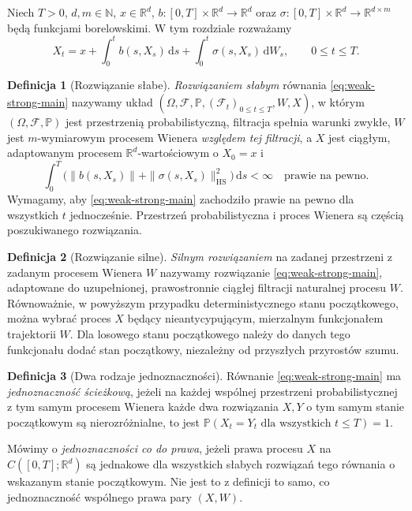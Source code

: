 \documentclass[11pt,a4paper,oneside]{report}
\numberwithin{equation}{chapter}
\theoremstyle{plain}
\theoremstyle{definition}
\newtheorem{definicja}{Definicja}[chapter]
\theoremstyle{remark}
\newcommand{\R}{\mathbb{R}}
\newcommand{\N}{\mathbb{N}}
\newcommand{\Prob}{\mathbb{P}}
\newcommand{\calF}{\mathcal{F}}
\newcommand{\dd}{\mathrm{d}}
\begin{document}
Niech $T>0$, $d,m\in\N$, $x\in\R^d$,
$b:[0,T]\times\R^d\to\R^d$ oraz
$\sigma:[0,T]\times\R^d\to\R^{d\times m}$ będą
funkcjami borelowskimi. W tym rozdziale rozważamy
\[
 X_t=x+\int_0^t b(s,X_s)\,\dd s
 +\int_0^t\sigma(s,X_s)\,\dd W_s,
 \qquad 0\le t\le T.
 \tag{14.1}\label{eq:weak-strong-main}
\]

\begin{definicja}[Rozwiązanie słabe]
\label{def:weak-solution}
\emph{Rozwiązaniem słabym} równania \eqref{eq:weak-strong-main}
nazywamy układ
$(\Omega,\calF,\Prob,(\calF_t)_{0\le t\le T},W,X)$,
w którym $(\Omega,\calF,\Prob)$ jest przestrzenią
probabilistyczną, filtracja spełnia warunki zwykłe,
$W$ jest $m$-wymiarowym procesem Wienera \emph{względem tej
filtracji}, a $X$ jest ciągłym, adaptowanym procesem
$\R^d$-wartościowym o $X_0=x$ i
\[
 \int_0^T\bigl(\|b(s,X_s)\|+
 \|\sigma(s,X_s)\|_{\mathrm{HS}}^2\bigr)\,\dd s<\infty
 \quad\text{prawie na pewno}.
\]
Wymagamy, aby \eqref{eq:weak-strong-main} zachodziło
prawie na pewno dla wszystkich $t$ jednocześnie.
Przestrzeń probabilistyczna i proces Wienera są częścią
poszukiwanego rozwiązania.
\end{definicja}

\begin{definicja}[Rozwiązanie silne]
\label{def:strong-solution-precise}
\emph{Silnym rozwiązaniem} na zadanej przestrzeni z zadanym
procesem Wienera $W$ nazywamy rozwiązanie
\eqref{eq:weak-strong-main}, adaptowane do uzupełnionej,
prawostronnie ciągłej filtracji naturalnej procesu $W$.
Równoważnie, w powyższym przypadku deterministycznego stanu
początkowego, można wybrać proces $X$ będący nieantycypującym,
mierzalnym funkcjonałem trajektorii $W$. Dla losowego stanu
początkowego należy do danych tego funkcjonału dodać stan
początkowy, niezależny od przyszłych przyrostów szumu.
\end{definicja}

\begin{definicja}[Dwa rodzaje jednoznaczności]
\label{def:path-law-uniq}
Równanie \eqref{eq:weak-strong-main} ma
\emph{jednoznaczność ścieżkową}, jeżeli na każdej wspólnej
przestrzeni probabilistycznej z tym samym procesem Wienera
każde dwa rozwiązania $X,Y$ o tym samym stanie początkowym
są nierozróżnialne, to jest
$\Prob(X_t=Y_t\text{ dla wszystkich }t\le T)=1$.

Mówimy o \emph{jednoznaczności co do prawa}, jeżeli prawa
procesu $X$ na $C([0,T];\R^d)$ są jednakowe dla wszystkich
słabych rozwiązań tego równania o wskazanym stanie początkowym.
Nie jest to z definicji to samo, co jednoznaczność wspólnego
prawa pary $(X,W)$.
\end{definicja}
\end{document}
